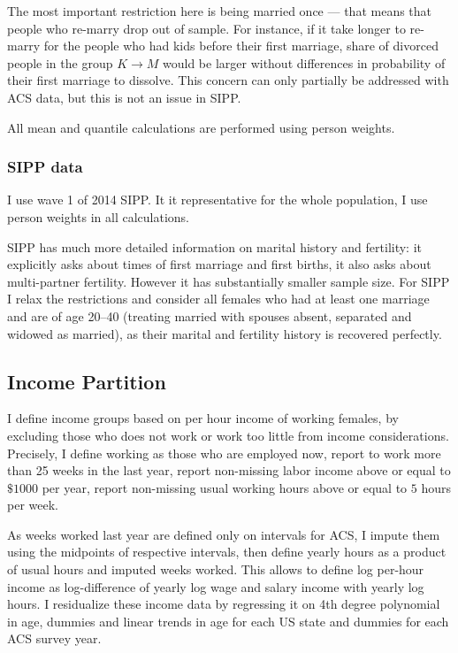 \documentclass[12pt,letter]{article}
\begin{document}
The most important restriction here is being married once --- that means that people who re-marry drop out of sample. For instance, if it take longer to re-marry for the people who had kids before their first marriage, share of divorced people in the group $K\to M$ would be larger without differences in probability of their first marriage to dissolve. This concern can only partially be addressed with ACS data, but this is not an issue in SIPP. 


All mean and quantile calculations are performed using person weights.

\subsubsection{SIPP data}

I use wave 1 of 2014 SIPP. It it representative for the whole population, I use person weights in all calculations.

SIPP has much more detailed information on marital history and fertility: it explicitly asks about times of first marriage and first births, it also asks about multi-partner fertility. However it has substantially smaller sample size. For SIPP I relax the restrictions and consider all females who had at least one marriage and are of age 20--40 (treating married with spouses absent, separated and widowed as married), as their marital and fertility history is recovered perfectly.


\subsection{Income Partition}
I define income groups based on per hour income of working females, by excluding those who does not work or work too little from income considerations. Precisely, I define working as those who are employed now, report to work more than 25 weeks in the last year, report non-missing labor income above or equal to $\$1000$ per year, report non-missing usual working hours above or equal to $5$ hours per week.

As weeks worked last year are defined only on intervals for ACS, I impute them using the midpoints of respective intervals, then define yearly hours as a product of usual hours and imputed weeks worked. This allows to define log per-hour income as log-difference of yearly log wage and salary income with yearly log hours. I residualize these income data by regressing it on 4th degree polynomial in age, dummies and linear trends in age for each US state and dummies for each ACS survey year.
\end{document}
